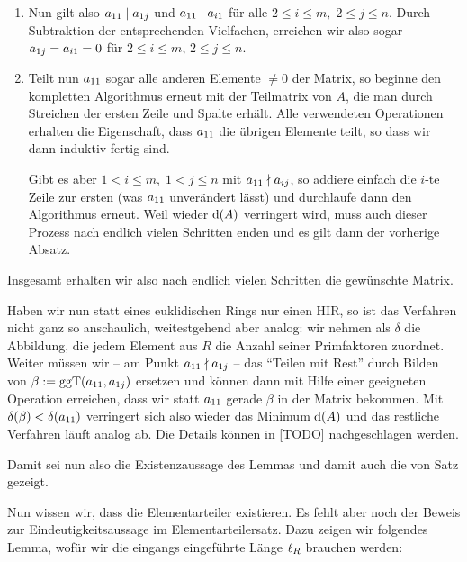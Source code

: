 \begin{proofsketch}
\begin{enumerate}[1.]
        \item
            Nun gilt also $a_{11} \mid a_{1j}$ und $a_{11} \mid a_{i1}$ für alle
            $2\leq i\leq m,\; 2\leq j\leq n$. Durch Subtraktion der entsprechenden
            Vielfachen, erreichen wir also sogar $a_{1j} = a_{i1} = 0$ für
            $2\leq i\leq m$, $2\leq j\leq n$.
            
        \item
            Teilt nun $a_{11}$ sogar alle anderen Elemente $\neq 0$ der Matrix, so
            beginne den kompletten Algorithmus erneut mit der Teilmatrix von
            $A$, die man durch Streichen der ersten Zeile und Spalte erhält.
            Alle verwendeten Operationen erhalten die Eigenschaft, dass $a_{11}$
            die übrigen Elemente teilt, so dass wir dann induktiv fertig sind.
            
            Gibt es aber $1<i\leq m,\; 1<j\leq n$ mit $a_{11} \nmid a_{ij}$, so
            addiere einfach die $i$-te Zeile zur ersten (was $a_{11}$ unverändert
            lässt) und durchlaufe dann den Algorithmus erneut. Weil wieder
            $\mathrm{d}(A)$ verringert wird, muss auch dieser Prozess nach endlich
            vielen Schritten enden und es gilt dann der vorherige Absatz.
    \end{enumerate}
    Insgesamt erhalten wir also nach endlich vielen Schritten die gewünschte
    Matrix.
    
    Haben wir nun statt eines euklidischen Rings nur einen HIR, so ist das
    Verfahren nicht ganz so anschaulich, weitestgehend aber analog: wir nehmen
    als $\delta$ die Abbildung, die jedem Element aus $R$ die Anzahl seiner
    Primfaktoren zuordnet. Weiter müssen wir -- am Punkt $a_{11} \nmid a_{1j}$ --
    das \enquote{Teilen mit Rest} durch Bilden von 
    $\beta := \mathrm{ggT}(a_{11},a_{1j})$ ersetzen und können dann mit Hilfe einer
    geeigneten Operation erreichen, dass wir statt $a_{11}$ gerade $\beta$ in
    der Matrix bekommen. Mit $\delta(\beta) < \delta(a_{11})$ verringert sich also
    wieder das Minimum $\mathrm{d}(A)$ und das restliche Verfahren läuft analog ab. Die
    Details können in [TODO] %
    nachgeschlagen werden.
    
    Damit sei nun also die Existenzaussage des Lemmas und damit auch die von
    Satz %
    gezeigt.
    \\
\end{proofsketch}

Nun wissen wir, dass die Elementarteiler existieren. Es fehlt aber noch der
Beweis zur Eindeutigkeitsaussage im Elementarteilersatz. Dazu zeigen wir
folgendes Lemma, wofür wir die eingangs eingeführte Länge $\operatorname{\ell}_{R}$ brauchen
werden:

